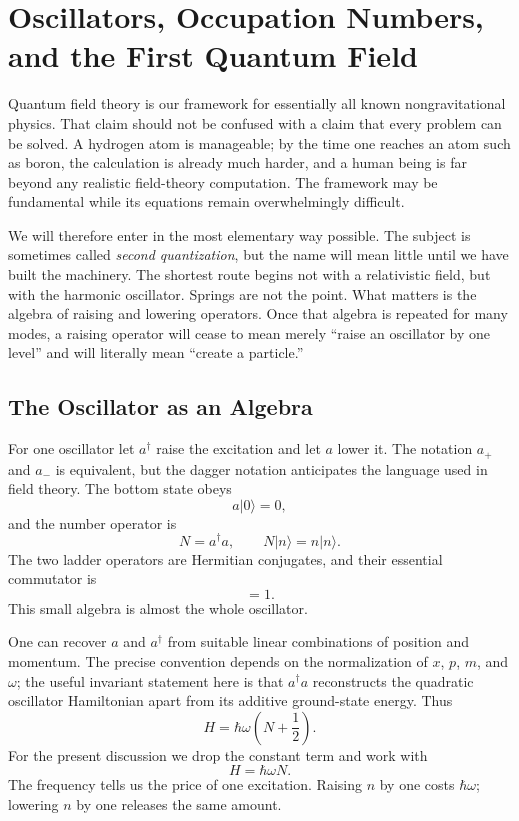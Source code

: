 \chapter{Oscillators, Occupation Numbers, and the First Quantum Field}

Quantum field theory is our framework for essentially all known nongravitational physics. That claim should not be confused with a claim that every problem can be solved. A hydrogen atom is manageable; by the time one reaches an atom such as boron, the calculation is already much harder, and a human being is far beyond any realistic field-theory computation. The framework may be fundamental while its equations remain overwhelmingly difficult.

We will therefore enter in the most elementary way possible. The subject is sometimes called \emph{second quantization}, but the name will mean little until we have built the machinery. The shortest route begins not with a relativistic field, but with the harmonic oscillator. Springs are not the point. What matters is the algebra of raising and lowering operators. Once that algebra is repeated for many modes, a raising operator will cease to mean merely ``raise an oscillator by one level'' and will literally mean ``create a particle.''

\section{The Oscillator as an Algebra}

For one oscillator let \(a^\dagger\) raise the excitation and let \(a\) lower it. The notation \(a_+\) and \(a_-\) is equivalent, but the dagger notation anticipates the language used in field theory. The bottom state obeys
\begin{equation}
a|0\rangle=0,
\end{equation}
and the number operator is
\begin{equation}
N=a^\dagger a,
\qquad
N|n\rangle=n|n\rangle.
\end{equation}
The two ladder operators are Hermitian conjugates, and their essential commutator is
\begin{equation}
[a,a^\dagger]=1.
\label{eq:l06-single-commutator}
\end{equation}
This small algebra is almost the whole oscillator.

One can recover \(a\) and \(a^\dagger\) from suitable linear combinations of position and momentum. The precise convention depends on the normalization of \(x\), \(p\), \(m\), and \(\omega\); the useful invariant statement here is that \(a^\dagger a\) reconstructs the quadratic oscillator Hamiltonian apart from its additive ground-state energy. Thus
\begin{equation}
H=\hbar\omega\left(N+\frac12\right).
\end{equation}
For the present discussion we drop the constant term and work with
\begin{equation}
H=\hbar\omega N.
\label{eq:l06-one-oscillator-hamiltonian}
\end{equation}
The frequency tells us the price of one excitation. Raising \(n\) by one costs \(\hbar\omega\); lowering \(n\) by one releases the same amount.

